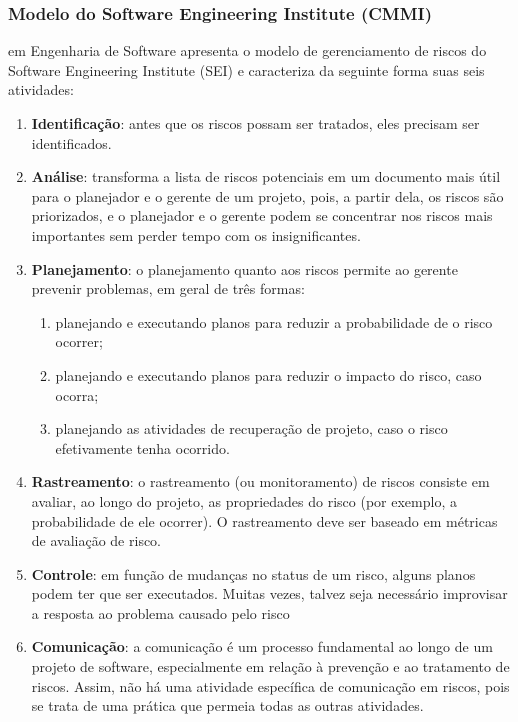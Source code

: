 \documentclass[
	12pt,
	openright,
	twoside,
	a4paper,
	english,
	brazil
	]{abntex2}
\begin{document}

\subsubsection{Modelo do Software Engineering Institute (CMMI)}

 em Engenharia de Software apresenta o modelo de gerenciamento de riscos do Software Engineering Institute (SEI) e caracteriza da seguinte forma suas seis atividades:

\begin{enumerate}
  \item \textbf{Identificação}: antes que os riscos possam ser tratados, eles precisam ser identificados.
  \item \textbf{Análise}: transforma a lista de riscos potenciais em um documento mais útil para o planejador e o gerente de um projeto, pois, a partir dela, os riscos são priorizados, e o planejador e o gerente podem se concentrar nos riscos mais importantes sem perder tempo com os insignificantes.
  \item \textbf{Planejamento}: o planejamento quanto aos riscos permite ao gerente prevenir problemas, em geral de três formas:
  \begin{enumerate}
    \item planejando e executando planos para reduzir a probabilidade de o risco ocorrer;  
    \item planejando e executando planos para reduzir o impacto do risco, caso ocorra;  
    \item planejando as atividades de recuperação de projeto, caso o risco efetivamente tenha ocorrido.
  \end{enumerate}
  \item \textbf{Rastreamento}: o rastreamento (ou monitoramento) de riscos consiste em avaliar, ao longo do projeto, as propriedades do risco (por exemplo, a probabilidade de ele ocorrer). O rastreamento deve ser baseado em métricas de avaliação de risco.  
  \item \textbf{Controle}: em função de mudanças no status de um risco, alguns planos podem ter que ser executados. Muitas vezes, talvez seja necessário improvisar a resposta ao problema causado pelo risco  
  \item \textbf{Comunicação}: a comunicação é um processo fundamental ao longo de um projeto de software, especialmente em relação à prevenção e ao tratamento de riscos. Assim, não há uma atividade específica de comunicação em riscos, pois se trata de uma prática que permeia todas as outras atividades.
\end{enumerate}
  
\end{document}
